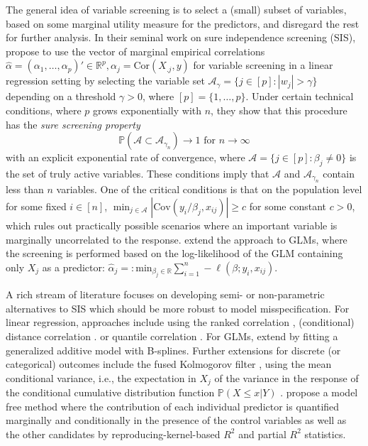 \documentclass[
  article]{jss}
\begin{document}
The general idea of variable screening is to select a (small) subset of
variables, based on some marginal utility measure for the predictors,
and disregard the rest for further analysis. In their seminal work on
sure independence screening (SIS), \citet{Fan2007SISforUHD} propose to
use the vector of marginal empirical correlations
\(\hat\alpha=(\alpha_1,\ldots ,\alpha_p)'\in\mathbb{R}^p,\alpha_j=\text{Cor}(X_{.j},y)\)
for variable screening in a linear regression setting by selecting the
variable set \(\mathcal{A}_\gamma = \{j\in [p]:|w_j|>\gamma\}\)
depending on a threshold \(\gamma>0\), where \([p]=\{1,\dots,p\}\).
Under certain technical conditions, where \(p\) grows exponentially with
\(n\), they show that this procedure has the \emph{sure screening
property} \[
\mathbb{P}(\mathcal{A} \subset \mathcal{A}_{\gamma_n})\to 1 \text{ for } n\to \infty
\] with an explicit exponential rate of convergence, where
\(\mathcal{A}=\{j\in[p]:\beta_j\neq 0\}\) is the set of truly active
variables. These conditions imply that \(\mathcal{A}\) and
\(\mathcal{A}_{\gamma_n}\) contain less than \(n\) variables. One of the
critical conditions is that on the population level for some fixed
\(i\in[n]\),
\(\min_{j\in\mathcal{A}}|\text{Cov}(y_i/\beta_j,x_{ij})| \geq c\) for
some constant \(c>0\), which rules out practically possible scenarios
where an important variable is marginally uncorrelated to the response.
\citet{Fan2010sisglms} extend the approach to GLMs, where the screening
is performed based on the log-likelihood of the GLM containing only
\(X_j\) as a predictor:
\(\hat\alpha_j=: \text{min}_{{\beta_j}\in\mathbb{R}}\sum_{i=1}^n -\ell(\beta;y_i,x_{ij})\).

A rich stream of literature focuses on developing semi- or
non-parametric alternatives to SIS which should be more robust to model
misspecification. For linear regression, approaches include using the
ranked correlation \citep{zhu2011model}, (conditional) distance
correlation \citep[@wang2015conditional]{li2012feature}. or quantile
correlation \citep{ma2016robust}. For GLMs, \citet{fan2011nonparametric}
extend \citet{Fan2010sisglms} by fitting a generalized additive model
with B-splines. Further extensions for discrete (or categorical)
outcomes include the fused Kolmogorov filter \citep{mai2013kolmogorov},
using the mean conditional variance, i.e., the expectation in \(X_j\) of
the variance in the response of the conditional cumulative distribution
function \(\mathbb{P}(X\leq x|Y)\) \citep{cui2015model}.
\citet{ke2023sufficient} propose a model free method where the
contribution of each individual predictor is quantified marginally and
conditionally in the presence of the control variables as well as the
other candidates by reproducing-kernel-based \(R^2\) and partial \(R^2\)
statistics.
\end{document}

